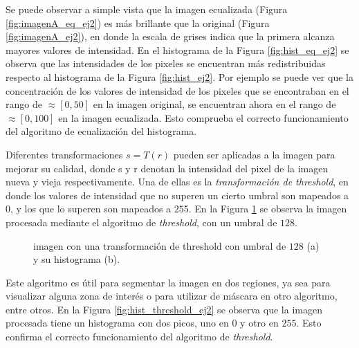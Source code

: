 \documentclass[11pt, twocolumn]{article}
\begin{document}
Se puede observar a simple vista que la imagen ecualizada (Figura \ref{fig:imagenA_eq_ej2}) es más brillante que la original (Figura \ref{fig:imagenA_ej2}), en donde la escala de grises indica que la primera alcanza mayores valores de intensidad. En el histograma de la Figura \ref{fig:hist_eq_ej2} se observa que las intensidades de los pixeles se encuentran más redistribuidas respecto al histograma de la Figura \ref{fig:hist_ej2}. Por ejemplo se puede ver que la concentración de los valores de intensidad de los pixeles que se encontraban en el rango de $\approx [0, 50]$ en la imagen original, se encuentran ahora en el rango de $\approx [0, 100]$ en la imagen ecualizada. Esto comprueba el correcto funcionamiento del algoritmo de ecualización del histograma.

Diferentes transformaciones $s = T(r)$ pueden ser aplicadas a la imagen para mejorar su calidad, donde s y r denotan la intensidad del pixel de la imagen nueva y vieja respectivamente. Una de ellas es la \textit{transformación de threshold}, en donde los valores de intensidad que no superen un cierto umbral son mapeados a $0$, y los que lo superen son mapeados a $25$5. En la Figura \ref{fig:figuras_ej_2_threshold} se observa la imagen procesada mediante el algoritmo de \textit{threshold}, con un umbral de $128$.

\begin{figure}[htbp]
  \centering
  \hfill
  \hfill
  \caption{imagen con una transformación de threshold con umbral de $128$ (a) y su histograma (b).}
  \label{fig:figuras_ej_2_threshold}
\end{figure}

Este algoritmo es útil para segmentar la imagen en dos regiones, ya sea para visualizar alguna zona de interés o para utilizar de máscara en otro algoritmo, entre otros. En la Figura \ref{fig:hist_threshold_ej2} se observa que la imagen procesada tiene un histograma con dos picos, uno en $0$ y otro en $255$. Esto confirma el correcto funcionamiento del algoritmo de \textit{threshold}.
\end{document}
